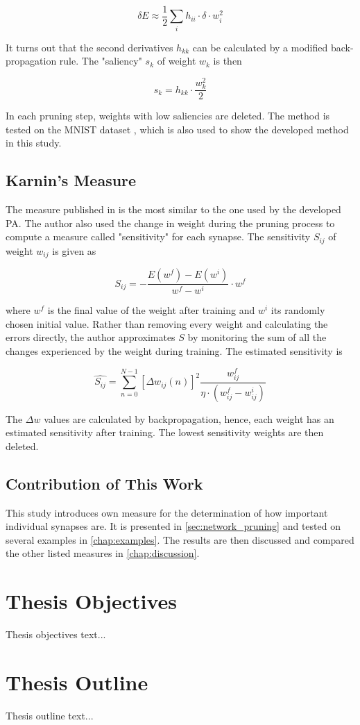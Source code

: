 \begin{equation}
\delta E \approx \frac{1}{2} \displaystyle{\sum_i h_{ii} \cdot \delta \cdot w_i^2}
\end{equation}

It turns out that the second derivatives $ h_{kk} $ can be calculated by a modified back-propagation rule. The "saliency" $ s_k $ of weight $ w_k $ is then

\begin{equation}
s_k = h_{kk} \cdot \frac{w_k^2}{2}
\end{equation}

In each pruning step, weights with low saliencies are deleted. The method is tested on the MNIST dataset \citep{lecun:mnist}, which is also used to show the developed method in this study.

\subsection*{Karnin's Measure} \label{ssec:karnins_measure}
The measure published in \citep{karnin:pa} is the most similar to the one used by the developed PA. The author also used the change in weight during the pruning process to compute a measure called "sensitivity" for each synapse. The sensitivity $ S_{ij} $ of weight $ w_{ij} $ is given as

\begin{equation}
S_{ij} = - \frac{E(w^f) - E(w^i)}{w^f - w^i} \cdot w^f
\end{equation}

where $ w^f $ is the final value of the weight after training and $ w^i $ its randomly chosen initial value. Rather than removing every weight and calculating the errors directly, the author approximates $ S $ by monitoring the sum of all the changes experienced by the weight during training. The estimated sensitivity is

\begin{equation}
\hat{S_{ij}} = \displaystyle{\sum_{n=0}^{N-1} \left[\Delta w_{ij} (n)\right]^2 \frac{w_{ij}^f}{\eta \cdot (w_{ij}^f - w_{ij}^i)}}
\end{equation}

The $ \Delta w $ values are calculated by backpropagation, hence, each weight has an estimated sensitivity after training. The lowest sensitivity weights are then deleted.

\subsection*{Contribution of This Work} \label{ssec:contribution_of_this_work}
This study introduces own measure for the determination of how important individual synapses are. It is presented in \cref{sec:network_pruning} and tested on several examples in \cref{chap:examples}. The results are then discussed and compared the other listed measures in \cref{chap:discussion}.

\section{Thesis Objectives} \label{sec:thesis_objectives}
Thesis objectives text...

\section{Thesis Outline} \label{sec:thesis_outline}
Thesis outline text...